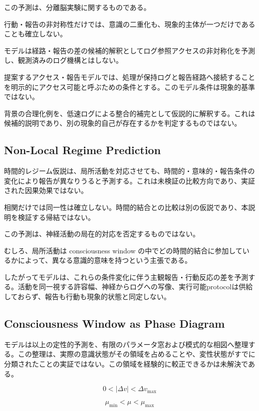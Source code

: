 この予測は、分離脳実験に関するものである。

行動・報告の非対称性だけでは、意識の二重化も、現象的主体が一つだけであることも確立しない。

モデルは経路・報告の差の候補的解釈としてログ参照アクセスの非対称化を予測し、観測済みのログ機構とはしない。

提案するアクセス・報告モデルでは、処理が保持ログと報告経路へ接続することを明示的にアクセス可能と呼ぶための条件とする。このモデル条件は現象的基準ではない。

背景の合理化例を、低速ログによる整合的補完として仮説的に解釈する。これは候補的説明であり、別の現象的自己が存在するかを判定するものではない。

\subsection{Non-Local Regime Prediction}

時間的レジーム仮説は、局所活動を対応させても、時間的・意味的・報告条件の変化により報告が異なりうると予測する。これは未検証の比較方向であり、実証された因果効果ではない。

相関だけでは同一性は確立しない。時間的結合との比較は別の仮説であり、本説明を検証する帰結ではない。

この予測は、神経活動の局在的対応を否定するものではない。

むしろ、局所活動は consciousness window の中でどの時間的結合に参加しているかによって、異なる意識的意味を持つという主張である。

したがってモデルは、これらの条件変化に伴う主観報告・行動反応の差を予測する。活動を同一視する許容幅、神経からログへの写像、実行可能protocolは供給しておらず、報告も行動も現象的状態と同定しない。

\subsection{Consciousness Window as Phase Diagram}

モデルは以上の定性的予測を、有限のパラメータ窓および模式的な相図へ整理する。この整理は、実際の意識状態がその領域を占めることや、変性状態がすでに分類されたことの実証ではない。この領域を経験的に較正できるかは未解決である。

\begin{equation}
0 < |\Delta v| < \Delta v_{\max}
\end{equation}

\begin{equation}
\mu_{\min} < \mu < \mu_{\max}
\end{equation}

